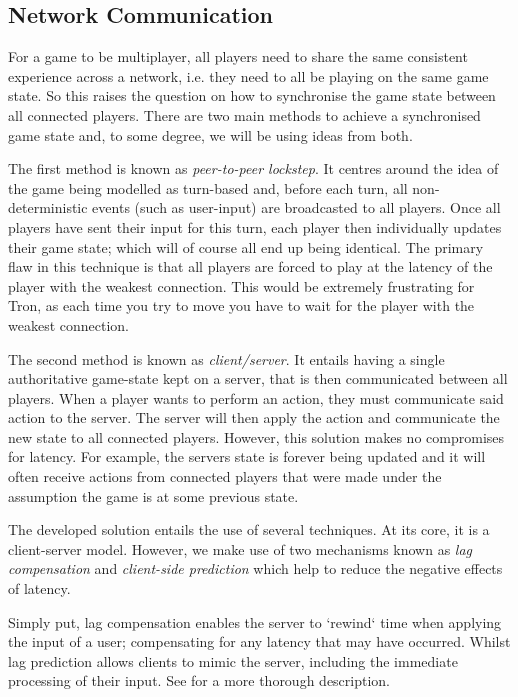 \documentclass{standalone}
\begin{document}
	\subsection{Network Communication}
		For a game to be multiplayer, all players need to share the same consistent experience across a network, i.e. they need to all be playing on the same game state. So this raises the question on how to synchronise the game state between all connected players. There are two main methods to achieve a synchronised game state and, to some degree, we will be using ideas from both.

		The first method is known as \emph{peer-to-peer lockstep}. It centres around the idea of the game being modelled as turn-based and, before each turn, all non-deterministic events (such as user-input) are broadcasted to all players. Once all players have sent their input for this turn, each player then individually updates their game state; which will of course all end up being identical. The primary flaw in this technique is that all players are forced to play at the latency of the player with the weakest connection. This would be extremely frustrating for Tron, as each time you try to move you have to wait for the player with the weakest connection.

		The second method is known as \emph{client/server}. It entails having a single authoritative game-state kept on a server, that is then communicated between all players. When a player wants to perform an action, they must communicate said action to the server. The server will then apply the action and communicate the new state to all connected players. However, this solution makes no compromises for latency. For example, the servers state is forever being updated and it will often receive actions from connected players that were made under the assumption the game is at some previous state.

		The developed solution entails the use of several techniques. At its core, it is a client-server model. However, we make use of two mechanisms known as \emph{lag compensation}\parencite{LagCompensation} and \emph{client-side prediction}\parencite{LagPrediction} which help to reduce the negative effects of latency.

		Simply put, lag compensation enables the server to `rewind` time when applying the input of a user; compensating for any latency that may have occurred. Whilst lag prediction allows clients to mimic the server, including the immediate processing of their input. See \parencite{LatencyCompensating} for a more thorough description.
\end{document}
